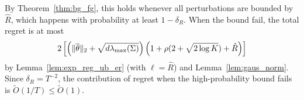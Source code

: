   By Theorem~\ref{thm:bg_fg}, this holds whenever all perturbations are bounded by
  $\hat R$, which happens with probability at least $1-\delta_R$. When the bound
  fail, the total regret is at most
  \begin{align*}
    2\left[\left(\|\overline \theta\|_2 + \sqrt{d\lambda_{\max}(\Sigma)}\right)\left(1 + \rho(2 +
      \sqrt{2 \log K}) + \hat R\right)\right]
  \end{align*}
  by Lemma~\ref{lem:exp_reg_ub_er} (with $\ell = \hat R$)
  and Lemma~\ref{lem:gaus_norm}. Since $\delta_R = T^{-2}$, the contribution of
  regret when the high-probability bound fails is $\tilde O(1/T) \le \tilde
  O(1)$.
